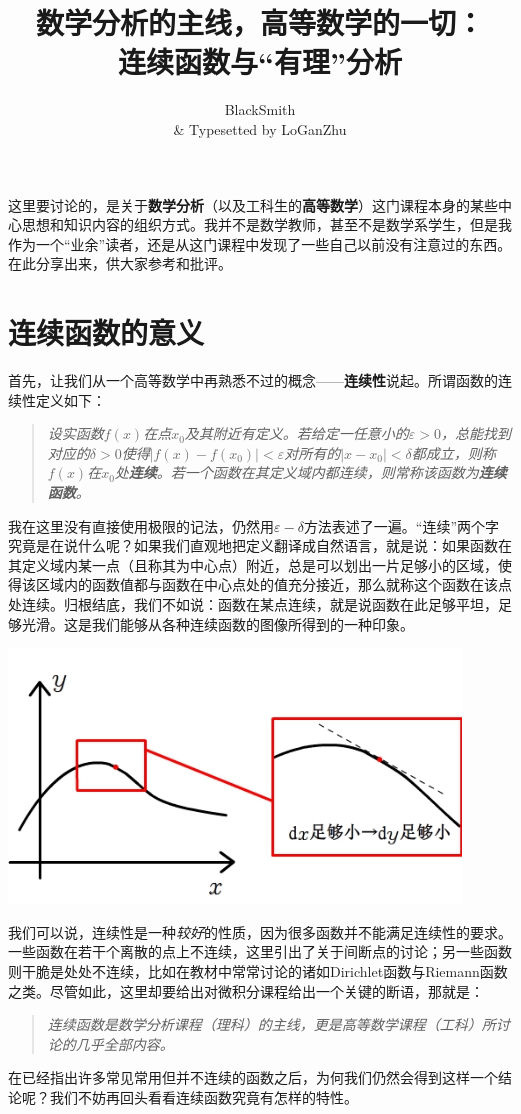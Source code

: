 \documentclass[12pt,a4paper]{article}
\title{数学分析的主线，高等数学的一切：\\连续函数与“有理”分析}
\author{BlackSmith\\ \& Typesetted by LoGanZhu}
\begin{document}
	{\bfseries\maketitle}\newpage
	{\large\tableofcontents}
	\newpage
	这里要讨论的，是关于{\bfseries 数学分析}（以及工科生的{\bfseries 高等数学}）这门课程本身的某些中心思想和知识内容的组织方式。我并不是数学教师，甚至不是数学系学生，但是我作为一个“业余”读者，还是从这门课程中发现了一些自己以前没有注意过的东西。在此分享出来，供大家参考和批评。
	
	\section{连续函数的意义}{
		首先，让我们从一个高等数学中再熟悉不过的概念——{\bfseries 连续性}说起。所谓函数的连续性定义如下：
		\begin{quote} \itshape
			设实函数$f(x)$在点$x_0$及其附近有定义。若给定一任意小的$\varepsilon>0$，总能找到对应的$\delta>0$使得$\mid f(x)-f(x_0)\mid <\varepsilon$对所有的$\mid x-x_0\mid <\delta$都成立，则称$f(x)$在$x_0$处{\bfseries 连续}。若一个函数在其定义域内都连续，则常称该函数为{\bfseries 连续函数}。
		\end{quote}
	
		我在这里没有直接使用极限的记法，仍然用$\varepsilon-\delta$方法表述了一遍。“连续”两个字究竟是在说什么呢？如果我们直观地把定义翻译成自然语言，就是说：如果函数在其定义域内某一点（且称其为中心点）附近，总是可以划出一片足够小的区域，使得该区域内的函数值都与函数在中心点处的值充分接近，那么就称这个函数在该点处连续。归根结底，我们不如说：函数在某点连续，就是说函数在此足够平坦，足够光滑。这是我们能够从各种连续函数的图像所得到的一种印象。
		\begin{center}
			\includegraphics[width=12cm]{o.jpg}
		\end{center}
		我们可以说，连续性是一种{\itshape 较好}的性质，因为很多函数并不能满足连续性的要求。一些函数在若干个离散的点上不连续，这里引出了关于间断点的讨论；另一些函数则干脆是处处不连续，比如在教材中常常讨论的诸如Dirichlet函数与Riemann函数之类。尽管如此，这里却要给出对微积分课程给出一个关键的断语，那就是：
		\begin{quote} \itshape
			连续函数是数学分析课程（理科）的主线，更是高等数学课程（工科）所讨论的几乎全部内容。
		\end{quote}
		在已经指出许多常见常用但并不连续的函数之后，为何我们仍然会得到这样一个结论呢？我们不妨再回头看看连续函数究竟有怎样的特性。
		
}
\end{document}
